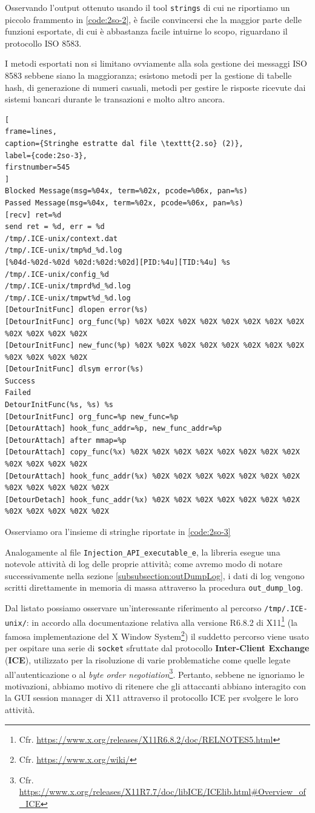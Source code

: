 \documentclass[10pt,a4paper, titlepage]{report}
\begin{document}
Osservando l'output ottenuto usando il tool \texttt{strings} di cui ne riportiamo un piccolo frammento in \ref{code:2so-2}, è facile convincersi che la maggior parte delle funzioni esportate, di cui è abbastanza facile intuirne lo scopo, riguardano il protocollo ISO 8583.

I metodi esportati non si limitano ovviamente alla sola gestione dei messaggi ISO 8583 sebbene siano la maggioranza; esistono metodi per la gestione di tabelle hash, di generazione di numeri casuali, metodi per gestire le risposte ricevute dai sistemi bancari durante le transazioni e molto altro ancora.

\begin{lstlisting}[
frame=lines, 
caption={Stringhe estratte dal file \texttt{2.so} (2)}, 
label={code:2so-3},
firstnumber=545
]
Blocked Message(msg=%04x, term=%02x, pcode=%06x, pan=%s)
Passed Message(msg=%04x, term=%02x, pcode=%06x, pan=%s)
[recv] ret=%d
send ret = %d, err = %d
/tmp/.ICE-unix/context.dat
/tmp/.ICE-unix/tmp%d_%d.log
[%04d-%02d-%02d %02d:%02d:%02d][PID:%4u][TID:%4u] %s
/tmp/.ICE-unix/config_%d
/tmp/.ICE-unix/tmprd%d_%d.log
/tmp/.ICE-unix/tmpwt%d_%d.log
[DetourInitFunc] dlopen error(%s)
[DetourInitFunc] org_func(%p) %02X %02X %02X %02X %02X %02X %02X %02X %02X %02X %02X %02X
[DetourInitFunc] new_func(%p) %02X %02X %02X %02X %02X %02X %02X %02X %02X %02X %02X %02X
[DetourInitFunc] dlsym error(%s)
Success
Failed
DetourInitFunc(%s, %s) %s
[DetourInitFunc] org_func=%p new_func=%p
[DetourAttach] hook_func_addr=%p, new_func_addr=%p
[DetourAttach] after mmap=%p
[DetourAttach] copy_func(%x) %02X %02X %02X %02X %02X %02X %02X %02X %02X %02X %02X %02X
[DetourAttach] hook_func_addr(%x) %02X %02X %02X %02X %02X %02X %02X %02X %02X %02X %02X %02X
[DetourDetach] hook_func_addr(%x) %02X %02X %02X %02X %02X %02X %02X %02X %02X %02X %02X %02X
\end{lstlisting}

Osserviamo ora l'insieme di stringhe riportate in \ref{code:2so-3}

Analogamente al file \texttt{Injection\_API\_executable\_e}, la libreria esegue una notevole attività di log delle proprie attività; come avremo modo di notare successivamente nella sezione \ref{subsubsection:outDumpLog}, i dati di log vengono scritti direttamente in memoria di massa attraverso la procedura \texttt{out\_dump\_log}.

Dal listato possiamo osservare un'interessante riferimento al percorso \texttt{/tmp/.ICE-unix/}: in accordo alla documentazione relativa alla versione R6.8.2 di X11\footnote{Cfr. \url{https://www.x.org/releases/X11R6.8.2/doc/RELNOTES5.html}} (la famosa implementazione del X Window System\footnote{Cfr. \url{https://www.x.org/wiki/}}) il suddetto percorso viene usato per ospitare una serie di \texttt{socket} sfruttate dal protocollo \textbf{Inter-Client Exchange} (\textbf{ICE}), utilizzato per la risoluzione di varie problematiche come quelle legate all'autenticazione o al \textit{byte order negotiation}\footnote{Cfr. \url{https://www.x.org/releases/X11R7.7/doc/libICE/ICElib.html\#Overview\_of\_ICE}}. Pertanto, sebbene ne ignoriamo le motivazioni, abbiamo motivo di ritenere che gli attaccanti abbiano interagito con la GUI session manager di X11 attraverso il protocollo ICE per svolgere le loro attività.
\end{document}
